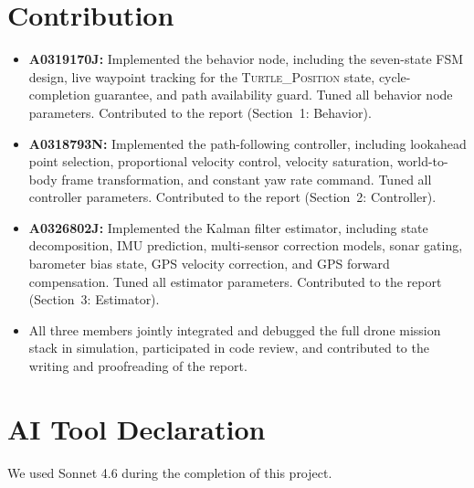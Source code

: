 \documentclass[12pt,twoside,letterpaper]{article}
\begin{document}
\section{Contribution}

\begin{itemize}
    \item \textbf{A0319170J:} Implemented the behavior node, including the seven-state FSM design, live waypoint tracking for the \textsc{Turtle\_Position} state, cycle-completion guarantee, and path availability guard. Tuned all behavior node parameters. Contributed to the report (Section~1: Behavior).
    \item \textbf{A0318793N:} Implemented the path-following controller, including lookahead point selection, proportional velocity control, velocity saturation, world-to-body frame transformation, and constant yaw rate command. Tuned all controller parameters. Contributed to the report (Section~2: Controller).
    \item \textbf{A0326802J:} Implemented the Kalman filter estimator, including state decomposition, IMU prediction, multi-sensor correction models, sonar gating, barometer bias state, GPS velocity correction, and GPS forward compensation. Tuned all estimator parameters. Contributed to the report (Section~3: Estimator).
    \item All three members jointly integrated and debugged the full drone mission stack in simulation, participated in code review, and contributed to the writing and proofreading of the report.
\end{itemize}

\section{AI Tool Declaration}
We used Sonnet 4.6 during the completion of this project.
\end{document}
